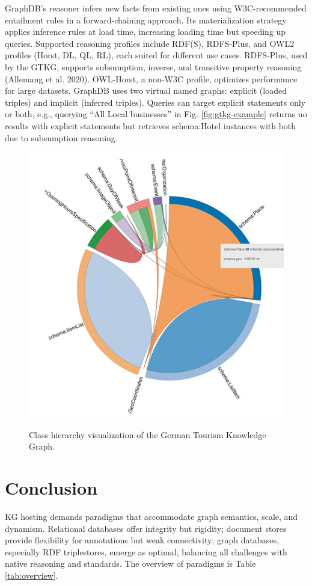 \documentclass[12pt]{article}
\begin{document}
GraphDB’s reasoner infers new facts from existing ones using W3C-recommended entailment rules in a forward-chaining approach. Its materialization strategy applies inference rules at load time, increasing loading time but speeding up queries. Supported reasoning profiles include RDF(S), RDFS-Plus, and OWL2 profiles (Horst, DL, QL, RL), each suited for different use cases. RDFS-Plus, used by the GTKG, supports subsumption, inverse, and transitive property reasoning (Allemang et al. 2020). OWL-Horst, a non-W3C profile, optimizes performance for large datasets. GraphDB uses two virtual named graphs: explicit (loaded triples) and implicit (inferred triples). Queries can target explicit statements only or both, e.g., querying “All Local businesses” in Fig. \ref{fig:gtkg-example} returns no results with explicit statements but retrieves schema:Hotel instances with both due to subsumption reasoning.

\begin{figure}
    \includegraphics[width=\linewidth]{imgs/19.9.jpeg}
    \label{fig:class-hierarchy-example1}
    \caption{Class hierarchy visualization of the German Tourism Knowledge Graph.}
\end{figure}
\section{Conclusion}
KG hosting demands paradigms that accommodate graph semantics, scale, and dynamism. Relational databases offer integrity but rigidity; document stores provide flexibility for annotations but weak connectivity; graph databases, especially RDF triplestores, emerge as optimal, balancing all challenges with native reasoning and standards. The overview of paradigms is Table \ref{tab:overview}.
\end{document}
